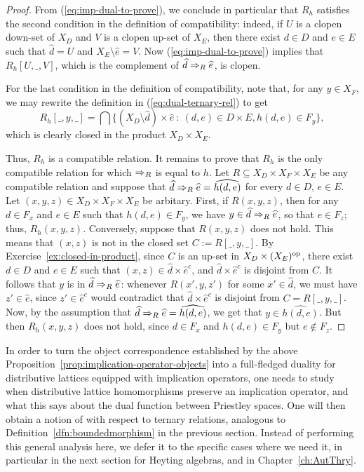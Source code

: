 \begin{proof}
  From (\ref{eq:imp-dual-to-prove}), we conclude in particular that $R_h$
  satisfies the second condition in the definition of compatibility: indeed, if $U$
  is a clopen down-set of $X_D$ and $V$ is a clopen up-set of $X_E$, then there
  exist $d \in D$ and $e \in E$ such that $\widehat{d} = U$ and $X_E \setminus
  \widehat{e} = V$. Now (\ref{eq:imp-dual-to-prove}) implies that $R_h[U, \_, V]$, which is the complement of $\widehat{d} \Rightarrow_R \widehat{e}$, is clopen.

  For the last condition in the definition of compatibility, note that, for any $y \in X_F$, we may rewrite the definition in (\ref{eq:dual-ternary-rel}) to get \[R_h[\_,y,\_] = \bigcap \{ (X_D \setminus \widehat{d}) \times \widehat{e} \ \colon \ (d,e) \in D \times E, h(d,e) \in F_y \}, \] which is clearly closed in the product $X_D \times X_E$.

  Thus, $R_h$ is a compatible relation. It remains to prove that $R_h$ is the only compatible relation for which $\Rightarrow_R$ is equal to $h$. Let $R \subseteq X_D \times X_F \times X_E$ be any compatible relation and suppose that $\widehat{d} \Rightarrow_R \widehat{e} = \widehat{h(d,e)}$ for every $d \in D$, $e \in E$. Let $(x,y,z) \in X_D \times X_F \times X_E$ be arbitary. First, if $R(x,y,z)$, then for any $d \in F_x$ and $e \in E$ such that $h(d,e) \in F_y$, we have $y \in \widehat{d} \Rightarrow_R \widehat{e}$, so that $e \in F_z$; thus, $R_h(x,y,z)$. Conversely, suppose that $R(x,y,z)$ does not hold. This means that $(x,z)$ is not in the closed set $C := R[\_,y,\_]$. By Exercise~\ref{ex:closed-in-product}, since $C$ is an up-set in $X_D \times (X_E)^{\mathrm{op}}$, there exist $d \in D$ and $e \in E$ such that $(x,z) \in \widehat{d} \times \widehat{e}^c$, and $\widehat{d} \times \widehat{e}^c$ is disjoint from $C$. It follows that $y$ is in $\widehat{d} \Rightarrow_R \widehat{e}$: whenever $R(x',y,z')$ for some $x' \in \widehat{d}$, we must have $z' \in \widehat{e}$, since $z' \in \widehat{e}^c$ would contradict that $\widehat{d} \times \widehat{e}^c$ is disjoint from $C = R[\_,y,\_]$. Now, by the assumption that $\widehat{d} \Rightarrow_R \widehat{e} = \widehat{h(d,e)}$, we get that $y \in \widehat{h(d,e)}$. But then $R_h(x,y,z)$ does not hold, since $d \in F_x$ and $h(d,e) \in F_y$ but $e \not\in F_z$.
\end{proof}
In order to turn the object correspondence established by the above Proposition~\ref{prop:implication-operator-objects} into a full-fledged duality for distributive lattices equipped with implication operators, one needs to study when distributive lattice homomorphisms preserve an implication operator, and what this says about the dual function between Priestley spaces. One will then obtain a notion of  with respect to ternary relations, analogous to Definition~\ref{dfn:boundedmorphism} in the previous section. Instead of performing this general analysis here, we defer it to the specific cases where we need it, in particular in the next section for Heyting algebras, and in Chapter~\ref{ch:AutThry}.

